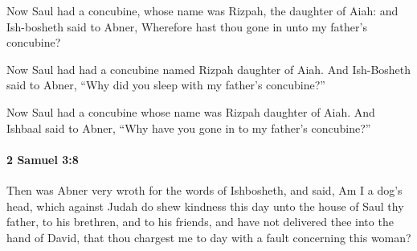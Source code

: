 			\begin{versebox}
					\item[BHS] 
					\item[ASV] Now Saul had a concubine, whose name was Rizpah, the daughter of Aiah: and Ish-bosheth said to Abner, Wherefore hast thou gone in unto my father's concubine?
					\item[NIV] Now Saul had had a concubine named Rizpah daughter of Aiah. And Ish-Bosheth said to Abner, “Why did you sleep with my father’s concubine?”
					\item[NRSV] Now Saul had a concubine whose name was Rizpah daughter of Aiah. And Ishbaal said to Abner, “Why have you gone in to my father’s concubine?”
			\end{versebox}

		\paragraph{2 Samuel 3:8} %
			\label{2SAMUEL-3-8}

			Then was Abner very wroth for the words of Ishbosheth, and said, Am I a dog’s head, which against Judah do shew kindness this day unto the house of Saul thy father, to his brethren, and to his friends, and have not delivered thee into the hand of David, that thou chargest me to day with a fault concerning this woman?

